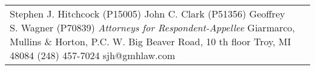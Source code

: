 \documentclass[12pt,\documentclassflag]{michiganCourtOfAppealsBrief}
\begin{document}
\begin{centering}
\begin{tabular}{p{} p{}}
{  Stephen J. Hitchcock (P15005)\newline
  John C. Clark (P51356) \newline
  Geoffrey S. Wagner (P70839)\newline
  \emph{Attorneys for Respondent-Appellee}\newline
Giarmarco, Mullins \& Horton, P.C.\newline
101 W. Big Beaver Road, 10 th floor\newline
Troy, MI 48084\newline
(248) 457-7024\newline
sjh@gmhlaw.com\newline
~}
\end{tabular}
\makeandletter
\par\vspace{\baselineskip}\vspace{\baselineskip}\vspace{\baselineskip}


\end{centering}

\pagestyle{romanparen}
\end{document}
